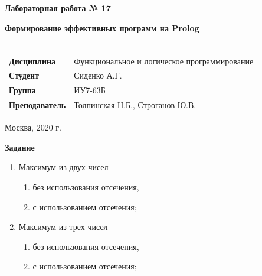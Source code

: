 \documentclass[a4paper,14pt]{extreport} %
\begin{document}
\begin{titlepage}
    \vspace{4cm}

    \begin{center}
        \textbf{Лабораторная работа № 17} \\ 
        \hfill
        
        \textbf{Формирование эффективных программ на Prolog} \\
        \vspace{0.5cm}
        \textbf{} \\
    \end{center}

    \vspace{4cm}

    \begin{flushleft}
        \begin{tabular}{ll}
            \textbf{Дисциплина} & Функциональное и логическое программирование \\
            \textbf{Студент} & Сиденко А.Г. \\
            \textbf{Группа} & ИУ7-63Б \\
            \textbf{Преподаватель} & Толпинская Н.Б., Строганов Ю.В.  \\
        \end{tabular}
    \end{flushleft}

    \vspace{4cm}

   \begin{center}
        Москва, 2020 г.
    \end{center}

\end{titlepage}

\textbf{Задание}

\begin{enumerate}
\item Максимум из двух чисел
\begin{enumerate}
\item без использования отсечения,
\item с использованием отсечения;
\end{enumerate}
\item Максимум из трех чисел 
\begin{enumerate}
\item без использования отсечения,
\item с использованием отсечения;
\end{enumerate}
\end{enumerate}
\end{document}
